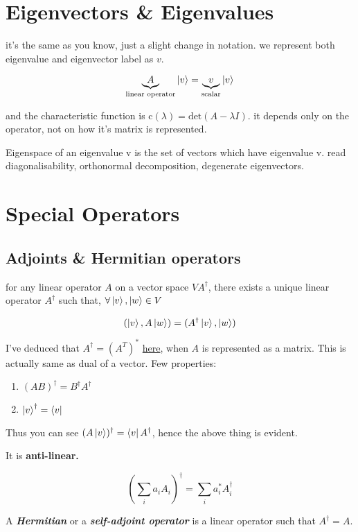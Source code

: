 \section{Eigenvectors \& Eigenvalues}

it's the same as you know, just a slight change in notation. we represent both eigenvalue and eigenvector label as $v$. 

$$
\underbrace{A}_{\text{linear operator}}\ket{v} = \underbrace{v}_{\text{scalar}}\ket{v}
$$

and the characteristic function is $\text{c}(\lambda) = \text{det}(A-\lambda I)$. it depends only on the operator, not on how it's matrix is represented.

Eigenspace of an eigenvalue v is the set of vectors which have eigenvalue v. read diagonalisability, orthonormal decomposition, degenerate eigenvectors.

\section{Special Operators}
\subsection{Adjoints \& Hermitian operators}

for any linear operator $A$ on a vector space $V$$A^{\dag}$, there exists a unique linear operator $A^{\dagger}$ such that, $\forall \ket{v},\ket{w} \in V$

$$
(\ket{v}, A\ket{w}) = (A^{\dag}\ket{v},\ket{w})
$$

I've deduced that $A^\dag = (A^T)^*$  \href{https://drive.google.com/file/d/12j8H4VlHlTrKI9OzHML-qFnC_DQJ2wmV/view?usp=drive_link}{here}, when $A$ is represented as a matrix. This is actually same as dual of a vector. Few properties:

\begin{enumerate}
\item $(AB)^\dag = B^\dag A^\dag$
\item $\ket{v}^\dag = \bra{v}$
\end{enumerate}

Thus you can see $(A\ket{v})^\dag = \bra{v}A^\dag$, hence the above thing is evident.

It is \textbf{anti-linear.}

$$
\left(\sum_i a_iA_i\right)^\dag =  \sum_i a_i^*A_i^\dag
$$

A \textbf{\textit{Hermitian}} or a \textit{\textbf{self-adjoint operator}} is a linear operator such that $A^\dag = A$.

